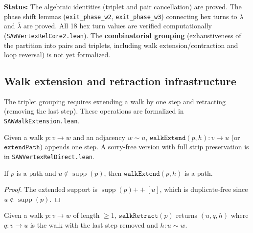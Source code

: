 \textbf{Status:} The algebraic identities (triplet and pair cancellation) are proved.
The phase shift lemmas (\texttt{exit\_phase\_w2}, \texttt{exit\_phase\_w3}) connecting
hex turns to $\lambda$ and $\bar\lambda$ are proved. All 18 hex turn values are
verified computationally (\texttt{SAWVertexRelCore2.lean}).
The \textbf{combinatorial grouping} (exhaustiveness of the partition into
pairs and triplets, including walk extension/contraction and loop reversal)
is not yet formalized.

\subsection{Walk extension and retraction infrastructure}

The triplet grouping requires extending a walk by one step and
retracting (removing the last step). These operations are formalized
in \texttt{SAWWalkExtension.lean}.

\begin{definition}\label{def:walkExtend}
\leanok
  Given a walk $p : v \to w$ and an adjacency $w \sim u$,
  $\texttt{walkExtend}(p, h) : v \to u$ (or $\texttt{extendPath}$) appends one step.
  A sorry-free version with full strip preservation is in
  \texttt{SAWVertexRelDirect.lean}.
\end{definition}

\begin{lemma}\label{lem:walkExtend_isPath}
\leanok
{}
  If $p$ is a path and $u \notin \operatorname{supp}(p)$,
  then $\texttt{walkExtend}(p, h)$ is a path.
\end{lemma}
\begin{proof}
\leanok
  The extended support is $\operatorname{supp}(p) \mathbin{++} [u]$,
  which is duplicate-free since $u \notin \operatorname{supp}(p)$.
\end{proof}

\begin{definition}\label{def:walkRetract}
\leanok
  Given a walk $p : v \to w$ of length $\geq 1$,
  $\texttt{walkRetract}(p)$ returns $(u, q, h)$ where
  $q : v \to u$ is the walk with the last step removed
  and $h : u \sim w$.
\end{definition}

